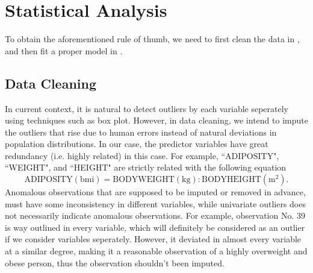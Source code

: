 \documentclass[12pt, letterpaper]{article}
\begin{document}
\section{Statistical Analysis}
To obtain the aforementioned rule of thumb, we need to first clean the data in , and then fit a proper model in . 
\subsection{Data Cleaning}
\label{subsec:Cleaning}
In current context, it is natural to detect outliers by each variable seperately using techniques such as box plot. However, in data cleaning, we intend to impute the outliers that rise due to human errors instead of natural deviations in population distributions. In our case, the predictor variables have great redundancy (i.e. highly related) in this case. For example, ``ADIPOSITY", ``WEIGHT", and ``HEIGHT" are strictly related with the following equation 
$$\mathrm{ADIPOSITY(bmi)} = \mathrm{BODY WEIGHT(kg)} : \mathrm{BODY HEIGHT(m^2)}.$$
Anomalous observations that are supposed to be imputed or removed in advance, must have some inconsistency in different variables, while univariate outliers does not necessarily indicate anomalous observations. For example, observation No. 39 is way outlined in every variable, which will definitely be considered as an outlier if we consider variables seperately. However, it deviated in almost every variable at a similar degree, making it a reasonable observation of a highly overweight and obese person, thus the observation shouldn't been imputed. 
\end{document}
